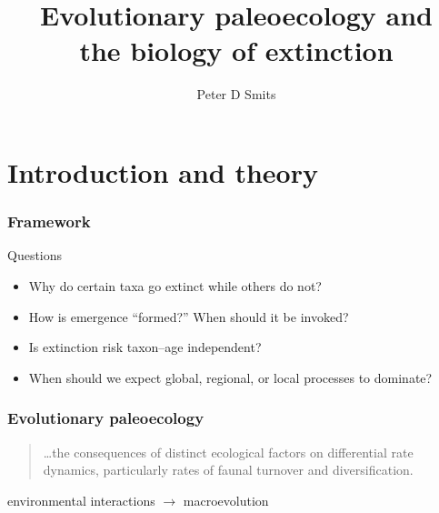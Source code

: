 \documentclass{beamer} \usepackage{amsmath,amsthm}
\title{Evolutionary paleoecology and\\ the biology of extinction}
\author{Peter D Smits}
\institute{Committee on Evolutionary Biology, University of Chicago}
\begin{document}
\begin{frame}
  \maketitle
\end{frame}

\begin{frame}
  \tableofcontents
\end{frame}


\section{Introduction and theory}

\begin{frame}
  \frametitle{Framework}

  \begin{alertblock}{Questions}
    \begin{itemize}
      \item Why do certain taxa go extinct while others do not?
      \item How is emergence ``formed?'' When should it be invoked?
      \item Is extinction risk taxon--age independent?
      \item When should we expect global, regional, or local processes to dominate?
    \end{itemize}
  \end{alertblock}
  
\end{frame}

\begin{frame}
  \frametitle{Evolutionary paleoecology}
  \begin{quotation}
    \dots the consequences of distinct ecological factors on differential rate dynamics, particularly rates of faunal turnover and diversification.

    \tiny{}
  \end{quotation}

  \vspace{1.3cm}

  \begin{center}
    environmental interactions \(\rightarrow\) macroevolution
  \end{center}
\end{frame}
\end{document}
